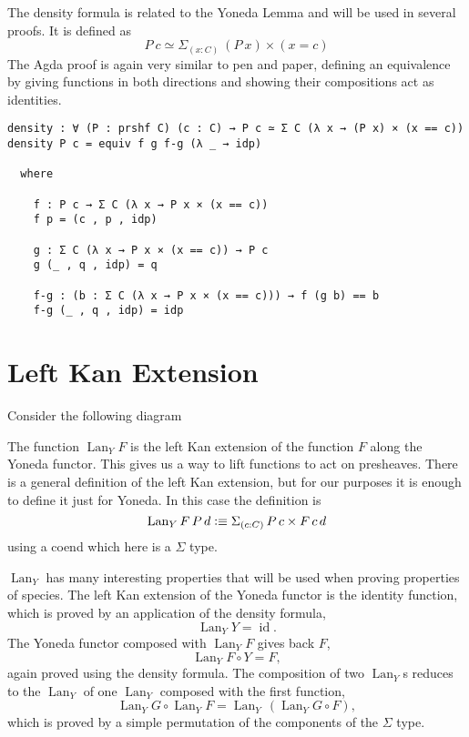\documentclass[12pt, parskip, DIV=14]{scrbook}
\newcommand{\defeq}{\vcentcolon\equiv}
\renewcommand{\circ}{\vysmwhtcircle}
\newcommand{\Lan}{\operatorname{Lan}}
\newcommand{\id}{\operatorname{id}}
\begin{document}
The density formula is related to the Yoneda Lemma and will be used in several proofs. It is defined as
$$P~c \simeq \Sigma_{(x : C)}~(P~x) \times (x = c)$$
The Agda proof is again very similar to pen and paper, defining an equivalence by giving functions in both directions and showing their compositions act as identities.

\begin{verbatim}
density : ∀ (P : prshf C) (c : C) → P c ≃ Σ C (λ x → (P x) × (x == c))
density P c = equiv f g f-g (λ _ → idp)

  where

    f : P c → Σ C (λ x → P x × (x == c))
    f p = (c , p , idp)

    g : Σ C (λ x → P x × (x == c)) → P c
    g (_ , q , idp) = q

    f-g : (b : Σ C (λ x → P x × (x == c))) → f (g b) == b
    f-g (_ , q , idp) = idp
\end{verbatim}

\section{Left Kan Extension}


Consider the following diagram
\begin{center}
\end{center}
The function $\Lan_Y F$ is the left Kan extension of the function $F$ along the Yoneda functor. This gives us a way to lift functions to act on presheaves. There is a general definition of the left Kan extension, but for our purposes it is enough to define it just for Yoneda. In this case the definition is
$$\Lan_Y F\,P\,d \defeq \Sigma_{(c : C)}\,P\,c \times F\,c\,d$$
using a coend which here is a $\Sigma$ type.

$\Lan_Y$ has many interesting properties that will be used when proving properties of species. The left Kan extension of the Yoneda functor is the identity function, which is proved by an application of the density formula,
$$\Lan_Y Y = \id.$$ The Yoneda functor composed with $\Lan_Y F$ gives back $F$,
$$\Lan_Y F \circ Y = F,$$ again proved using the density formula. The composition of two $\Lan_Y$s reduces to the $\Lan_Y$ of one $\Lan_Y$ composed with the first function,
$$\Lan_Y G \circ \Lan_Y F = \Lan_Y\,(\Lan_Y G \circ F),$$
which is proved by a simple permutation of the components of the $\Sigma$ type.
\end{document}
